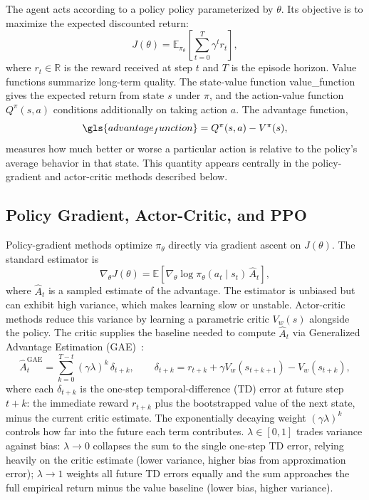 The agent acts according to a policy \gls{policy} parameterized by $\theta$.
Its objective is to maximize the expected discounted return:
%
\begin{equation}
    J(\theta) = \mathbb{E}_{\pi_\theta}\!\left[\sum_{t=0}^{T} \gamma^t
    r_t\right],
\end{equation}
%
where $r_t \in \mathbb{R}$ is the reward received at step $t$ and $T$ is the
episode horizon.  Value functions summarize long-term quality.  The state-value function
\gls{value_function} gives the expected return from state $s$ under $\pi$, and the
action-value function $Q^\pi(s,a)$ conditions additionally on taking action
$a$.  The advantage function,
%
\begin{equation}
    \gls{advantage_function} = Q^\pi(s,a) - V^\pi(s),
\end{equation}
%
measures how much better or worse a particular action is relative to the
policy's average behavior in that state.  This quantity appears centrally in
the policy-gradient and actor-critic methods described below.

\subsection{Policy Gradient, Actor-Critic, and PPO}

Policy-gradient methods optimize $\pi_\theta$ directly via gradient ascent on
$J(\theta)$.  The standard estimator is
%
\begin{equation}
    \nabla_\theta J(\theta) =
    \mathbb{E}\!\left[
        \nabla_\theta \log \pi_\theta(a_t \mid s_t)\,\hat{A}_t
    \right],
    \label{eq:pg}
\end{equation}
%
where $\hat{A}_t$ is a sampled estimate of the advantage.  The estimator is
unbiased but can exhibit high variance, which makes learning slow or unstable.
Actor-critic methods reduce this variance by learning a parametric critic
$V_w(s)$ alongside the policy.  The critic supplies the baseline needed to
compute $\hat{A}_t$ via Generalized Advantage Estimation
(GAE)~\cite{schulman2015gae}:
%
\begin{equation}
    \hat{A}_t^{\mathrm{GAE}} = \sum_{k=0}^{T-t}(\gamma\lambda)^k\,\delta_{t+k},
    \qquad
    \delta_{t+k} = r_{t+k} + \gamma V_w(s_{t+k+1}) - V_w(s_{t+k}),
    \label{eq:gae}
\end{equation}
%
where each $\delta_{t+k}$ is the one-step temporal-difference (TD) error at
future step $t+k$: the immediate reward $r_{t+k}$ plus the bootstrapped value
of the next state, minus the current critic estimate.  The exponentially
decaying weight $(\gamma\lambda)^k$ controls how far into the future each
term contributes.  $\lambda \in [0,1]$ trades variance against bias:
$\lambda \to 0$ collapses the sum to the single one-step TD error, relying
heavily on the critic estimate (lower variance, higher bias from approximation
error); $\lambda \to 1$ weights all future TD errors equally and the sum
approaches the full empirical return minus the value baseline (lower bias,
higher variance).

